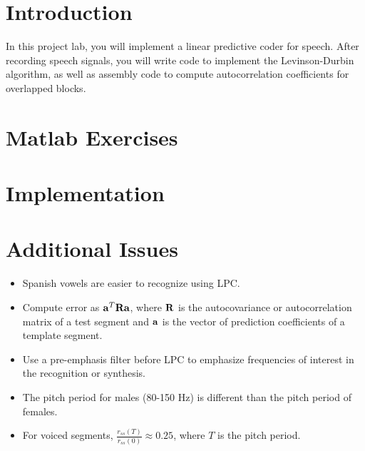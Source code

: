 \documentclass[11pt]{handout}
\begin{document}
\setlength{\baselineskip}{0.5cm}
\setlength{\parskip}{0.5cm}

\makeboxtitle
\vspace{0.3cm}

\section{Introduction}
In this project lab, you will implement a linear predictive coder 
for speech.  After recording speech signals, you will write 
\matlab code to implement the Levinson-Durbin algorithm, as well as 
assembly code to compute autocorrelation coefficients for overlapped 
blocks.



\section{Matlab Exercises}



\section{Implementation}



\section{Additional Issues}
\begin{itemize}
\item{Spanish vowels are easier to recognize using LPC.}
\item{Compute error as ${\bf a}^{T}{\bf R}{\bf a}$, 
      where ${\bf R}$ is the autocovariance or autocorrelation matrix 
      of a test segment and ${\bf a}$ is the vector of prediction 
      coefficients of a template segment.}
\item{Use a pre-emphasis filter before LPC to emphasize frequencies of 
      interest in the recognition or synthesis.}
\item{The pitch period for males (80-150 Hz) is different than the 
      pitch period of females.}
\item{For voiced segments, $\frac{r_{ss}(T)}{r_{ss}(0)} \approx 0.25$, 
      where $T$ is the pitch period.}
\end{itemize}



\end{document}
